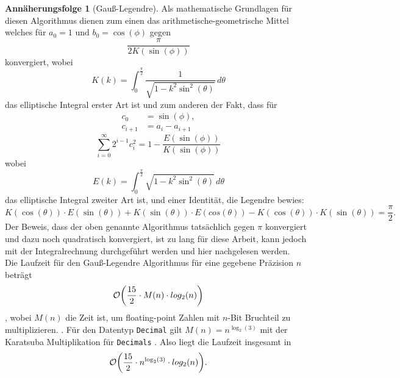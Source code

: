 \documentclass{scrartcl}
\theoremstyle{definition}
\newtheorem{approximation sequence}{Annäherungsfolge}
\DeclarePairedDelimiter{\paren}{\lparen}{\rparen}
\begin{document}
\begin{approximation sequence}[Gauß-Legendre]
Als mathematische Grundlagen \cite{Eugene-Salamin} für diesen Algorithmus
dienen zum einen das arithmetische-geometrische Mittel welches für \(a_0 = 1
\text{ und } b_0 = \cos(\phi)\) gegen
\begin{equation*}
    \frac{\pi}{2K(\sin(\phi))}
\end{equation*}
konvergiert, wobei
\begin{equation*}
    K(k) = \int_0^{\frac{\pi}{2}} \frac{1}{\sqrt{1 - k^2 \sin^2(\theta)}} \, d\theta
\end{equation*}
das elliptische Integral erster Art ist und zum anderen der Fakt, dass für
\begin{align*}
    c_0 & = \sin(\phi), \\ c_{i+1} &= a_i - a_{i+1}
\end{align*}
\begin{equation*}
    \sum_{i = 0}^\infty 2^{i-1} c_{i}^{2} = 1 - \frac{E(\sin(\phi))}{K(\sin(\phi))}
\end{equation*}
wobei
\begin{equation*}
    E(k) = \int_0^{\frac{\pi}{2}}\sqrt{1 - k^2 \sin^2(\theta)} \, d\theta
\end{equation*}
das elliptische Integral zweiter Art ist, und einer Identität, die Legendre
bewies:
\begin{equation*}
    K(\cos(\theta)) \cdot E(\sin(\theta))
    + K(\sin(\theta)) \cdot E(cos(\theta))
    - K(\cos(\theta)) \cdot K(\sin(\theta))
    = \frac{\pi}{2}.
\end{equation*}
Der Beweis, dass der oben genannte Algorithmus tatsächlich gegen \(\pi\)
konvergiert und dazu noch quadratisch konvergiert, ist zu lang für diese
Arbeit, kann jedoch mit der Integralrechnung durchgeführt werden und hier
\cite{Gauß-Legendre} nachgelesen werden. \\ Die Laufzeit für den Gauß-Legendre
Algorithmus für eine gegebene Präzision \(n\) beträgt
\[\mathcal{O}\paren*{\frac{15}{2} \cdot M(n) \cdot log_2(n)}\], wobei \(M(n)\)
die Zeit ist, um floating-point Zahlen mit \(n\)-Bit Bruchteil zu multiplizieren.
\cite{AGM-Gauß-Legendre}. Für den Datentyp \texttt{Decimal} gilt \(M(n) =
n^{\log_2(3)}\) mit der Karatsuba Multiplikation für \texttt{Decimals}
\cite{Decimal-Multiplication}. Also liegt die Laufzeit insgesamt in
\[\mathcal{O}\paren*{\frac{15}{2} \cdot n^{\log_{2}(3)} \cdot log_2(n)}.\]
\end{approximation sequence}
\end{document}
